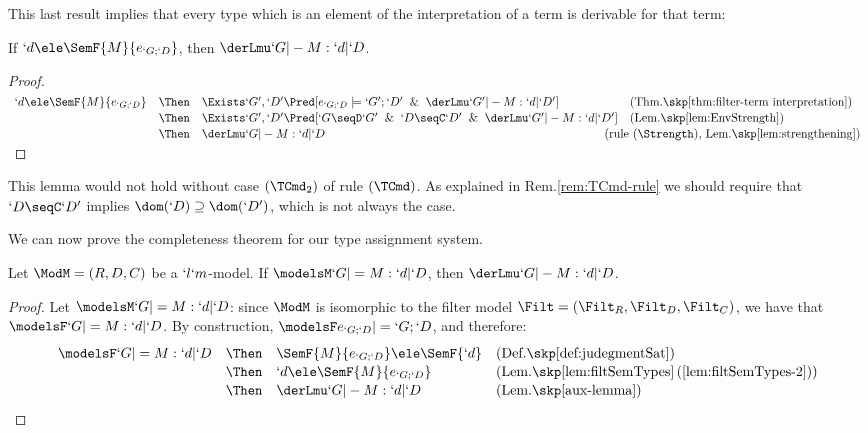 \documentclass{lmcs}
\begin{document}
This last result implies that every type which is an element of the interpretation of a term is derivable for that term:

 \begin{lem} \label{aux-lemma}
If $ `d \ele \SemF { M }{e_{`G;`D }} $, then $ \derLmu `G |- M : `d | `D $.
 \end{lem}
 \begin{proof}
$ \def \arraystretch{1.1} \begin{array}[t]{lcll}
`d \ele \SemF { M }{ e_{`G;`D } } 
	& \Then & 
 \Exists`G',`D' \Pred [ e_{`G;`D } \models `G';`D' \And \derLmu `G' |- M : `d | `D' ] 
	& (\textrm{Thm.\skp\ref{thm:filter-term interpretation}}) \\
	& \Then & 
 \Exists`G',`D' \Pred [ `G\seqD `G' \And `D\seqC `D' \And \derLmu `G' |- M : `d | `D' ] 
	& (\textrm{Lem.\skp\ref{lem:EnvStrength}}) \\
	& \Then & 
 \derLmu `G |- M : `d | `D 
	& \kern-7.5mm (\textrm{rule $(\Strength)$, Lem.\skp\ref{lem:strengthening}}) %
 \end{array} $
 \arrayqed
 \end{proof}

This lemma would not hold without case $(\TCmd_2)$ of rule $(\TCmd)$. As explained in Rem.\skp\ref{rem:TCmd-rule} we should require that $`D\seqC `D'$ implies $\dom(`D) \supseteq \dom(`D')$, which is not always the case.

We can now prove the completeness theorem for our type assignment system.

 \begin{thm}[Completeness] \label{thm:typeAssCompl}
Let ${\ModM} = (R,D,C)$ be a $`l`m$-model. If $ \modelsM `G |= M : `d | `D $, then $ \derLmu `G |- M : `d | `D $.
 \end{thm}
	
 \begin{proof}
Let $ \modelsM `G |= M : `d | `D $: since ${\ModM}$ is isomorphic to the filter model $\Filt = (\Filt_R,\Filt_D,\Filt_C)$,
we have that $\modelsF `G |= M : `d | `D $. By construction, $\modelsF e_{`G;`D } |= `G;`D $, and therefore:
%
 \[ \def \arraystretch{1.1} \begin{array}{lcll}
 \modelsF `G |= M : `d | `D 
	& \Then & 
 \SemF { M }{ e_{`G;`D } } \ele \SemF {`d} & (\textrm{Def.\skp\ref{def:judegmentSat}}) \\
	& \Then & 
`d \ele \SemF { M }{ e_{`G;`D } } & (\textrm{Lem.\skp\ref{lem:filtSemTypes}\,(\ref{lem:filtSemTypes-2})}) \\
	& \Then &
 \derLmu `G |- M : `d | `D & 
	(\textrm{Lem.\skp\ref{aux-lemma}}) 
 \end{array} \]
\arrayqed[-22pt]

 \end{proof}
\end{document}
